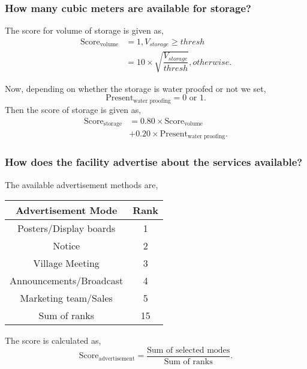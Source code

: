 \documentclass[oneside,twocolumn]{article}
\newcommand{\tsub}[2]{\text{#1}_{\text{#2}}}
\newenvironment{ttable}
               {
                 \begin{center}
                   \begin{tabular}{c|c}
                     \hline
               }
               {
                 \\ \hline
                   \end{tabular}
                 \end{center}
               }
\begin{document}
 \subsubsection{How many cubic meters are available for storage?}
               The score for volume of storage is given as,
               \begin{align*}
                 \tsub{Score}{volume} &= 1, V_{storage} \ge thresh \\
                 &= 10 \times \sqrt{\dfrac{V_{storage}}{thresh}}, otherwise.
               \end{align*}

               Now, depending on whether the storage is water proofed or not
               we set,
               \[
               \tsub{Present}{water proofing} = 0 \text{ or } 1.
               \]
               Then the score of storage is given as,
               \begin{align*}
                 \tsub{Score}{storage} &= 0.80 \times \tsub{Score}{volume} \\
                 &+ 0.20 \times \tsub{Present}{water proofing}.
               \end{align*}
               
               \subsubsection{How does the facility advertise about the services available?}
               The available advertisement methods are,
               \begin{ttable}
                 Advertisement Mode & Rank \\ \hline
                 Posters/Display boards & 1 \\
                 Notice & 2 \\
                 Village Meeting & 3 \\
                 Announcements/Broadcast & 4 \\
                 Marketing team/Sales & 5 \\ \hline
                 Sum of ranks & 15
               \end{ttable}

               The score is calculated as,
               \[
               \tsub{Score}{advertisement} = \dfrac{\text{Sum of selected modes}}{\text{Sum of ranks}}.
               \]
\end{document}
